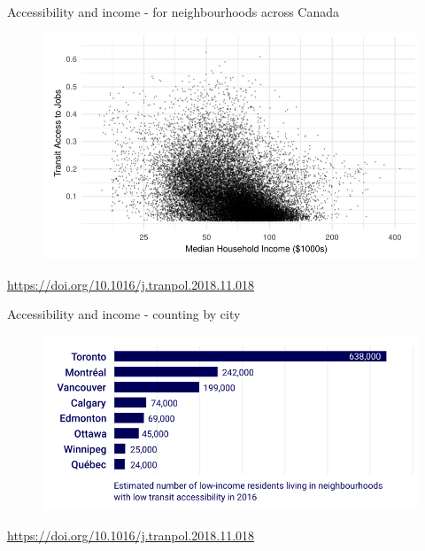 \documentclass[aspectratio=169]{beamer}
\begin{document}
\begin{frame}
	
	Accessibility and income - for neighbourhoods across Canada
	
	\begin{figure}
		\centering
		\includegraphics[width=0.94\linewidth]{images/access_income.png}
	\end{figure}
	
	\tiny\url{https://doi.org/10.1016/j.tranpol.2018.11.018}
	
\end{frame}



\begin{frame}
	
	Accessibility and income - counting by city
	
	\begin{figure}
		\centering
		\includegraphics[width=0.74\linewidth]{images/tpov_city_plot.png}
	\end{figure}

	\tiny\url{https://doi.org/10.1016/j.tranpol.2018.11.018}
	
\end{frame}
\end{document}
